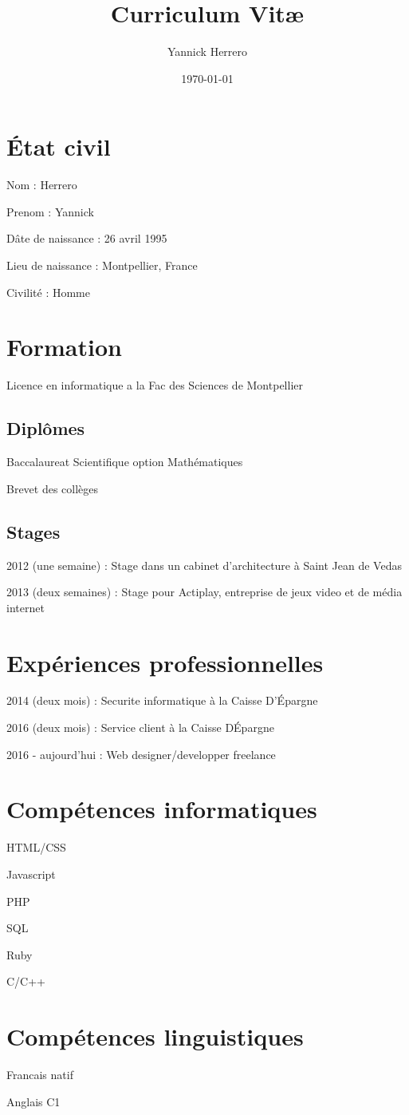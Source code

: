 \documentclass[a4paper]{article}
\title{Curriculum Vit\ae}
\author{Yannick Herrero}
\date{\today}
\begin{document}
\maketitle

\section{\'Etat civil}
Nom : Herrero\par
Prenom : Yannick\par
D\^ate de naissance : 26 avril 1995\par
Lieu de naissance : Montpellier, France\par
Civilit\'e : Homme


\section{Formation}
Licence en informatique a la Fac des Sciences de Montpellier

\subsection{Dipl\^omes}
Baccalaureat Scientifique option Math\'ematiques\par
Brevet des collèges

\subsection{Stages}
2012 (une semaine) : Stage dans un cabinet d'architecture à Saint Jean de Vedas\par
2013 (deux semaines) : Stage pour Actiplay, entreprise de jeux video et de m\'edia internet

\section{Exp\'eriences professionnelles}
2014 (deux mois) : Securite informatique à la Caisse D'\'Epargne\par
2016 (deux mois) : Service client à la Caisse D\'Epargne\par
2016 - aujourd'hui : Web designer/developper freelance

\section*{Comp\'etences informatiques}
HTML/CSS\par
Javascript\par
PHP\par
SQL\par
Ruby\par
C/C++

\section*{Comp\'etences linguistiques}
Francais natif\par
Anglais C1
\end{document}
